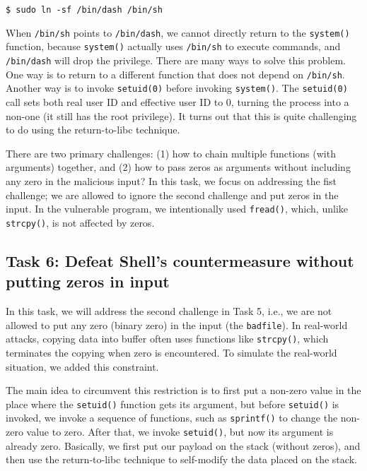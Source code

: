 \begin{lstlisting}
$ sudo ln -sf /bin/dash /bin/sh
\end{lstlisting}


When \texttt{/bin/sh} points to \texttt{/bin/dash}, we cannot directly return 
to the \texttt{system()} function, because \texttt{system()} actually uses 
\texttt{/bin/sh} to execute commands, and \texttt{/bin/dash} will 
drop the privilege. There are many ways to solve this problem. One way 
is to return to a different function that does not depend on \texttt{/bin/sh}. 
Another way is to invoke \texttt{setuid(0)} before 
invoking \texttt{system()}. The \texttt{setuid(0)} call sets both real user ID and  
effective user ID to 0, turning the process into a non-\setuid one (it still has 
the root privilege). It turns out that this is quite challenging to do 
using the return-to-libc technique. 


There are two primary challenges: (1) how to 
chain multiple functions (with arguments) together, and (2) how to
pass zeros as arguments without including any zero in the malicious 
input? In this task, we focus on addressing the fist challenge; 
we are allowed to ignore the second challenge and 
put zeros in the input.
In the vulnerable program, we 
intentionally used \texttt{fread()}, which, unlike \texttt{strcpy()},
is not affected by zeros. 



\subsection{Task 6: Defeat Shell's countermeasure without putting zeros in input}


In this task, we will address the second challenge in Task 5, i.e., we are 
not allowed to put any zero (binary zero) 
in the input (the \texttt{badfile}). In real-world attacks,
copying data into buffer often uses functions like \texttt{strcpy()}, which
terminates the copying when zero is encountered. To simulate the real-world
situation, we added this constraint. 

The main idea to circumvent this restriction 
is to first put a non-zero value in the place where
the \texttt{setuid()} function gets its argument, but before 
\texttt{setuid()} is invoked, we invoke a sequence of 
functions, such as \texttt{sprintf()} to change the non-zero
value to zero. After that, we invoke \texttt{setuid()}, but now 
its argument is already zero. Basically, we first put our payload 
on the stack (without zeros), and then use the return-to-libc technique to self-modify
the data placed on the stack. 

